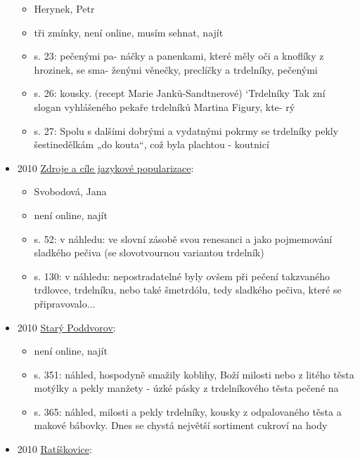 \begin{itemize}
  \begin{itemize}
  \tightlist
  \item
    Herynek, Petr
  \item
    tři zmínky, není online, musím sehnat, najít
  \item
    s. 23: pečenými pa- náčky a panenkami, které měly oči a knoflíky z
    hrozinek, se sma- ženými věnečky, preclíčky a trdelníky, pečenými
  \item
    s. 26: kousky. (recept Marie Janků-Sandtnerové) `Trdelníky Tak zní
    slogan vyhlášeného pekaře trdelníků Martina Figury, kte- rý
  \item
    s. 27: Spolu s dalšími dobrými a vydatnými pokrmy se trdelníky pekly
    šestinedělkám „do kouta``, což byla plachtou - koutnicí
  \end{itemize}
\item
  2010
  \href{https://ceskadigitalniknihovna.cz/uuid/uuid:467e18f0-1b9b-11e8-a0cf-005056827e52}{Zdroje
  a cíle jazykové popularizace}:

  \begin{itemize}
  \tightlist
  \item
    Svobodová, Jana
  \item
    není online, najít
  \item
    s. 52: v náhledu: ve slovní zásobě svou renesanci a jako pojmemování
    sladkého pečiva (se slovotvournou variantou trdelník)
  \item
    s. 130: v náhledu: nepostradatelné byly ovšem při pečení takzvaného
    trdlovce, trdelníku, nebo také šmetrdólu, tedy sladkého pečiva,
    které se připravovalo...
  \end{itemize}
\item
  2010
  \href{https://ceskadigitalniknihovna.cz/uuid/uuid:de93a670-fd0d-11e7-b1a1-005056827e52}{Starý
  Poddvorov}:

  \begin{itemize}
  \tightlist
  \item
    není online, najít
  \item
    s. 351: náhled, hospodyně smažily koblihy, Boží milosti nebo z
    litého těsta motýlky a pekly manžety - úzké pásky z trdelníkového
    těsta pečené na
  \item
    s. 365: náhled, milosti a pekly trdelníky, kousky z odpalovaného
    těsta a makové bábovky. Dnes se chystá největší sortiment cukroví na
    hody
  \end{itemize}
\item
  2010
  \href{https://ceskadigitalniknihovna.cz/uuid/uuid:eb53abf0-80d8-11e7-b92d-005056827e51}{Ratíškovice}:


\end{itemize}
